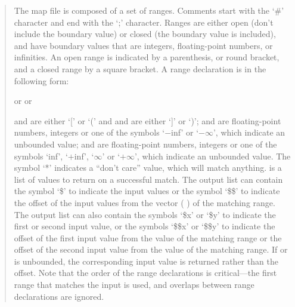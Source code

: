 \begin{quote}
The map file is composed of a set of ranges.
Comments start with the `\#' character and end with the `;' character.
Ranges are either open (don't include the boundary value) or closed (the boundary value is included),
and have boundary values that are integers, floating-point numbers, or infinities.
An open range is indicated by a parenthesis, or round bracket, and a closed range by a square bracket.
A range declaration is in the following form:

\centerline{ or   or }

 and  are either `[' or `(' and  and  are
either `]' or `)';
 and  are floating-point numbers, integers or one of the symbols `$-$inf' or
`$-\infty$', which indicate an unbounded value;
 and  are floating-point numbers, integers or one of the symbols `inf', `$+$inf',
`$\infty$' or `$+\infty$', which indicate an unbounded value.
The symbol `*' indicates a ``don't care'' value, which will match anything.
 is a list of values to return on a successful match.
The output list can contain the symbol `\$' to indicate the input values or the symbol `\$\$' to
indicate the offset of the input values from the vector ( ) of the matching range.
The output list can also contain the symbols `\$x' or `\$y' to indicate the first or second input value, or
the symbols `\$\$x' or `\$\$y' to indicate the offset of the first input value from the  value of the
matching range or the offset of the second input value from the  value of the matching range.
If  or  is unbounded, the corresponding input value is returned rather than the offset.
Note that the order of the range declarations is critical---the first range that matches the input
is used, and overlaps between range declarations are ignored.
\end{quote}

\objItemMessage

\objItemComments

